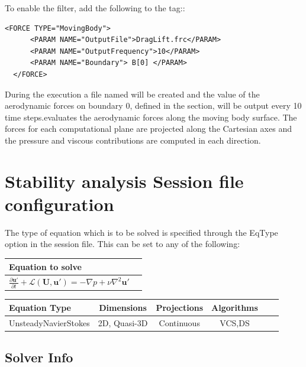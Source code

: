 To enable the filter, add the following to the  tag::

\begin{lstlisting}[style=XMLStyle]
  <FORCE TYPE="MovingBody">
      <PARAM NAME="OutputFile">DragLift.frc</PARAM>
      <PARAM NAME="OutputFrequency">10</PARAM>
      <PARAM NAME="Boundary"> B[0] </PARAM>
  </FORCE>
\end{lstlisting}

During the execution a file named  will be created and the
value of the aerodynamic forces on boundary 0, defined in the
 section, will be output every 10 time steps.evaluates the aerodynamic forces along the moving body surface. The
forces for each computational plane are projected along the Cartesian axes and the pressure and viscous contributions are computed in each direction.


\section{Stability analysis Session file configuration}
The type of equation which is to be solved is specified through the \inltt
{EqType} option in the session file. This can be set to any of the following:

\begin{center}
\footnotesize
\begin{tabular}{lc}
\toprule
{Equation to solve}  \\
\midrule
$\frac{\partial\mathbf{u'}}{\partial t} +\mathcal{L}(\mathbf{U},\mathbf{u'})=-\nabla p+\nu \nabla^2 \mathbf{u'}$\\
\bottomrule
\end{tabular}
\end{center}


\begin{center}
\footnotesize
\begin{tabular}{lccccc}
\toprule
{Equation Type} & {Dimensions} &{Projections} &{Algorithms} \\
\midrule
UnsteadyNavierStokes & 2D, Quasi-3D& Continuous &VCS,DS\\
\bottomrule
\end{tabular}
\end{center}

\subsection{Solver Info}
\label{SectionIncNS_SolverInfo_Stab}

